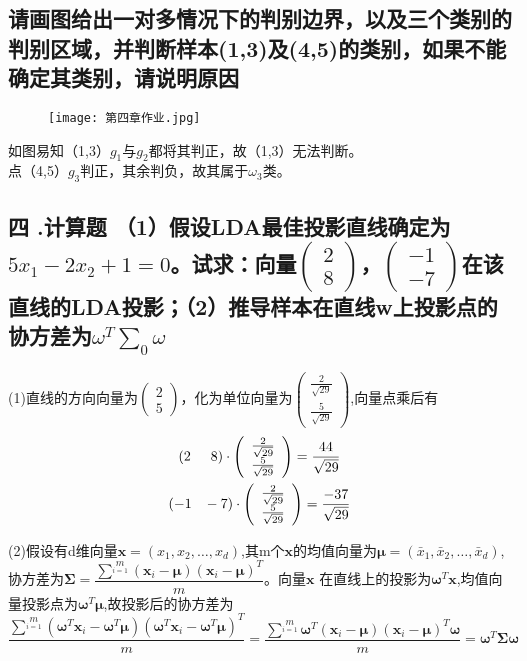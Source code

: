 \documentclass{ctexart}
\begin{document}
\subsection*{请画图给出一对多情况下的判别边界，以及三个类别的判别区域，并判断样本(1,3)及(4,5)的类别，如果不能确定其类别，请说明原因}

\begin{figure}[H]
\texttt{[image: 第四章作业.jpg]}

\end{figure}

如图易知（1,3）$g_1与g_2$都将其判正，故（1,3）无法判断。\\
点（4,5）$g_3$判正，其余判负，故其属于$\omega_3$类。

\subsection*{四 .计算题 （1）假设LDA最佳投影直线确定为$5x_1-2x_2+1=0$。试求：向量$\left(\begin{array}{c}2\\8\end{array}\right)$，$\left(\begin{array}{c}-1\\-7\end{array}\right)$在该直线的LDA投影；（2）推导样本在直线w上投影点的协方差为$\omega^T\sum_0\omega$}

(1)直线的方向向量为$\left(\begin{array}{c}2\\5\end{array}\right)$，化为单位向量为$\left(\begin{array}{c}\frac{2}{\sqrt{29}}\\ \frac{5}{\sqrt{29}}\end{array}\right)$,向量点乘后有
\begin{gather*}
(2 \hspace{5mm} 8)\cdot \left(\begin{array}{c}\frac{2}{\sqrt{29}}\\ \frac{5}{\sqrt{29}}\end{array}\right)=\frac{44}{\sqrt{29}}\\
(-1 \hspace{3mm} -7)\cdot \left(\begin{array}{c}\frac{2}{\sqrt{29}}\\ \frac{5}{\sqrt{29}}\end{array}\right)=\frac{-37}{\sqrt{29}}
\end{gather*}

(2)假设有d维向量$\mathbf{x}=(x_1,x_2,\dots,x_d)$,其m个$\mathbf{x}$的均值向量为$\bm{\mu}=(\bar{x}_1,\bar{x}_2,\dots,\bar{x}_d)$,
协方差为$\bm{\Sigma}=\dfrac{\sum\limits^m\limits_{i=1}(\bm{x}_i-\bm{\mu})(\bm{x}_i-\bm{\mu})^T}{m}$。向量$\bm{x}$ 在直线上的投影为$\bm{\omega}^T\bm{x}$,均值向量投影点为$\bm{\omega}^T\bm{\mu}$,故投影后的协方差为$\dfrac{\sum\limits^m\limits_{i=1}(\bm{\omega}^T\bm{x}_i-\bm{\omega}^T\bm{\mu})(\bm{\omega}^T\bm{x}_i-\bm{\omega}^T\bm{\mu})^T}{m}=\dfrac{\sum\limits^m\limits_{i=1}\bm{\omega}^T(\bm{x}_i-\bm{\mu})(\bm{x}_i-\bm{\mu})^T\bm{\omega}}{m}=\bm{\omega}^T\bm{\Sigma}\bm{\omega}$
\end{document}
